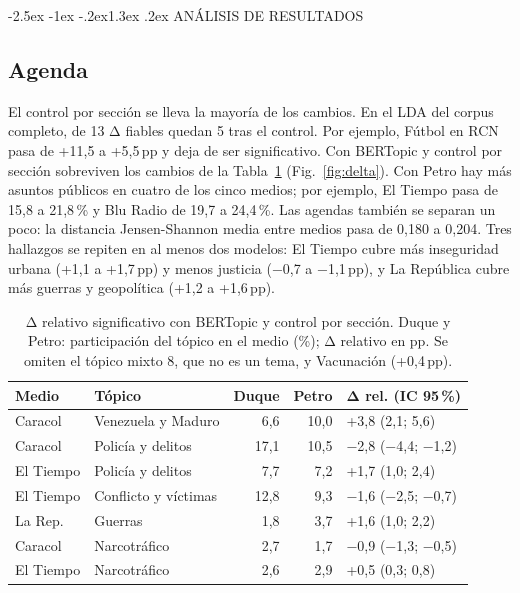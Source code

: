 \documentclass[10pt,twocolumn]{article}
\makeatletter
\renewcommand{\section}{\@startsection{section}{1}{\z@}%
  {-2.5ex \@plus -1ex \@minus -.2ex}{1.3ex \@plus .2ex}%
  {\normalfont\large\bfseries\centering}}
\newcommand{\pp}{\,pp}
\makeatother
\begin{document}
\section{ANÁLISIS DE RESULTADOS}
\subsection{Agenda}
El control por sección se lleva la mayoría de los cambios. En el LDA del corpus
completo, de 13 Δ fiables quedan 5 tras el control. Por ejemplo, Fútbol en RCN
pasa de +11,5 a +5,5\pp{} y deja de ser significativo. Con BERTopic y control por
sección sobreviven los cambios de la Tabla~\ref{tab:delta}
(Fig.~\ref{fig:delta}). Con Petro hay más asuntos públicos en cuatro de los cinco
medios; por ejemplo, El Tiempo pasa de 15,8 a 21,8\,\% y Blu Radio de 19,7 a
24,4\,\%. Las agendas también se separan un poco: la distancia Jensen-Shannon
media entre medios pasa de 0,180 a 0,204. Tres hallazgos se repiten en al menos
dos modelos: El Tiempo cubre más inseguridad urbana (+1,1 a +1,7\pp{}) y menos
justicia (−0,7 a −1,1\pp{}), y La República cubre más guerras y geopolítica
(+1,2 a +1,6\pp{}).

\begin{table}[t]
\centering\footnotesize
\caption{Δ relativo significativo con BERTopic y control por sección. Duque y
Petro: participación del tópico en el medio (\%); Δ relativo en pp. Se omiten el tópico mixto 8,
que no es un tema, y Vacunación (+0,4\pp).}
\label{tab:delta}
\setlength{\tabcolsep}{2pt}
\begin{tabular}{llrrl}\toprule
Medio & Tópico & Duque & Petro & Δ rel. (IC 95\,\%)\\\midrule
Caracol & Venezuela y Maduro & 6,6 & 10,0 & +3,8 (2,1; 5,6)\\
Caracol & Policía y delitos & 17,1 & 10,5 & −2,8 (−4,4; −1,2)\\
El Tiempo & Policía y delitos & 7,7 & 7,2 & +1,7 (1,0; 2,4)\\
El Tiempo & Conflicto y víctimas & 12,8 & 9,3 & −1,6 (−2,5; −0,7)\\
La Rep. & Guerras & 1,8 & 3,7 & +1,6 (1,0; 2,2)\\
Caracol & Narcotráfico & 2,7 & 1,7 & −0,9 (−1,3; −0,5)\\
El Tiempo & Narcotráfico & 2,6 & 2,9 & +0,5 (0,3; 0,8)\\
\bottomrule\end{tabular}
\end{table}
\end{document}
